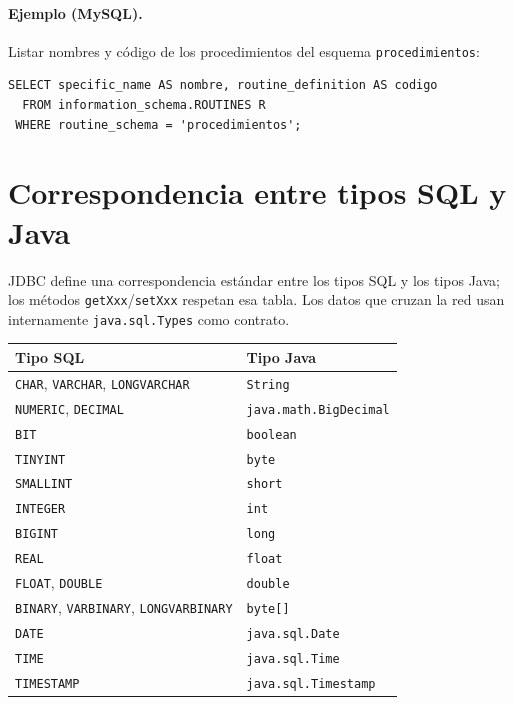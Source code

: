 \documentclass[11pt,a4paper]{article}
\begin{document}
\paragraph{Ejemplo (MySQL).} Listar nombres y código de los
procedimientos del esquema \texttt{procedimientos}:

\begin{lstlisting}
SELECT specific_name AS nombre, routine_definition AS codigo
  FROM information_schema.ROUTINES R
 WHERE routine_schema = 'procedimientos';
\end{lstlisting}

\section{Correspondencia entre tipos SQL y Java}

JDBC define una correspondencia estándar entre los tipos SQL y los
tipos Java; los métodos \texttt{getXxx}/\texttt{setXxx} respetan esa
tabla. Los datos que cruzan la red usan internamente
\texttt{java.sql.Types} como contrato.

\begin{center}
\begin{tabular}{@{}l l@{}}
\toprule
\textbf{Tipo SQL} & \textbf{Tipo Java} \\
\midrule
\texttt{CHAR}, \texttt{VARCHAR}, \texttt{LONGVARCHAR} &
\texttt{String} \\
\texttt{NUMERIC}, \texttt{DECIMAL} & \texttt{java.math.BigDecimal} \\
\texttt{BIT} & \texttt{boolean} \\
\texttt{TINYINT} & \texttt{byte} \\
\texttt{SMALLINT} & \texttt{short} \\
\texttt{INTEGER} & \texttt{int} \\
\texttt{BIGINT} & \texttt{long} \\
\texttt{REAL} & \texttt{float} \\
\texttt{FLOAT}, \texttt{DOUBLE} & \texttt{double} \\
\texttt{BINARY}, \texttt{VARBINARY}, \texttt{LONGVARBINARY} &
\texttt{byte[]} \\
\texttt{DATE} & \texttt{java.sql.Date} \\
\texttt{TIME} & \texttt{java.sql.Time} \\
\texttt{TIMESTAMP} & \texttt{java.sql.Timestamp} \\
\bottomrule
\end{tabular}
\end{center}
\end{document}
